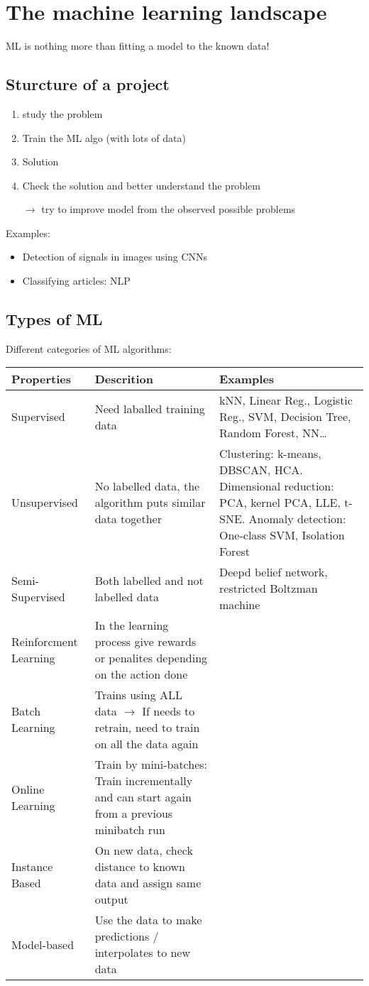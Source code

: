 \section{The machine learning landscape}
ML is nothing more than fitting a model to the known data!
\subsection{Sturcture of a project}
\begin{enumerate}
    \item study the problem
    \item Train the ML algo (with lots of data)
    \item Solution
    \item Check the solution and better understand the problem
    \item[$\rightarrow$] try to improve model from the observed possible problems
\end{enumerate}

Examples:
\begin{itemize}
    \item Detection of signals in images using CNNs
    \item Classifying articles: NLP
\end{itemize}


\subsection{Types of ML}
Different categories of ML algorithms:

\begin{tabular}{p{}p{}p{}}
  \textbf{Properties} & \textbf{Descrition} & \textbf{Examples} \\
  \hline
  Supervised &  Need laballed training data & kNN, Linear Reg., Logistic Reg., SVM, Decision Tree, Random Forest, NN\ldots \\
  Unsupervised & No labelled data, the algorithm puts similar data together & Clustering: k-means, DBSCAN, HCA. Dimensional reduction: PCA, kernel PCA, LLE, t-SNE. Anomaly detection: One-class SVM, Isolation Forest\\
  Semi-Supervised & Both labelled and not labelled data & Deepd belief network, restricted Boltzman machine \\
  Reinforcment Learning & In the learning process give rewards or penalites depending on the action done & \\
  \hline\hline
  Batch Learning & Trains using ALL data $\rightarrow$ If needs to retrain, need to train on all the data again & \\
  Online Learning & Train by mini-batches: Train incrementally and can start again from a previous minibatch run & \\
  \hline\hline
  Instance Based & On new data, check distance to known data and assign same output &\\
  Model-based & Use the data to make predictions / interpolates to new data & \\
\end{tabular}

